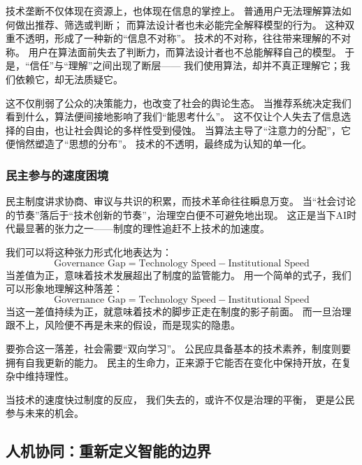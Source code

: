技术垄断不仅体现在资源上，也体现在信息的掌控上。  
普通用户无法理解算法如何做出推荐、筛选或判断；  
而算法设计者也未必能完全解释模型的行为。  
这种双重不透明，形成了一种新的“信息不对称”。  
技术的不对称，往往带来理解的不对称。  
用户在算法面前失去了判断力，而算法设计者也不总能解释自己的模型。  
于是，“信任”与“理解”之间出现了断层——  
我们使用算法，却并不真正理解它；我们依赖它，却无法质疑它。

这不仅削弱了公众的决策能力，也改变了社会的舆论生态。  
当推荐系统决定我们看到什么，算法便间接地影响了我们“能思考什么”。  
这不仅让个人失去了信息选择的自由，也让社会舆论的多样性受到侵蚀。  
当算法主导了“注意力的分配”，它便悄然塑造了“思想的分布”。  
技术的不透明，最终成为认知的单一化。

\subsubsection{民主参与的速度困境}

民主制度讲求协商、审议与共识的积累，而技术革命往往瞬息万变。  
当“社会讨论的节奏”落后于“技术创新的节奏”，治理空白便不可避免地出现。  
这正是当下AI时代最显著的张力之一——制度的理性追赶不上技术的加速度。

我们可以将这种张力形式化地表达为：
\begin{equation}
\text{Governance Gap} = \text{Technology Speed} - \text{Institutional Speed}
\end{equation}
当差值为正，意味着技术发展超出了制度的监管能力。  
用一个简单的式子，我们可以形象地理解这种落差：
\begin{equation}
\text{Governance Gap} = \text{Technology Speed} - \text{Institutional Speed}
\end{equation}
当这一差值持续为正，就意味着技术的脚步正走在制度的影子前面。  
而一旦治理跟不上，风险便不再是未来的假设，而是现实的隐患。

要弥合这一落差，社会需要“双向学习”。  
公民应具备基本的技术素养，制度则要拥有自我更新的能力。  
民主的生命力，正来源于它能否在变化中保持开放，在复杂中维持理性。

\begin{center}
当技术的速度快过制度的反应，  
我们失去的，或许不仅是治理的平衡，  
更是公民参与未来的机会。  
\end{center}

\subsection{人机协同：重新定义智能的边界}

